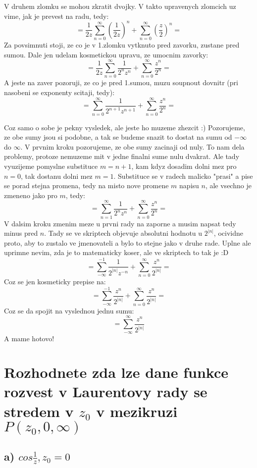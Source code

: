 V druhem zlomku se mohou zkratit dvojky. V takto upravenych zlomcich uz vime, jak je prevest na radu, tedy:
$$ = \frac{1}{2z} \sum_{n=0}^\infty \left( \frac{1}{2z}\right)^n + \sum_{n=0}^\infty \left(\frac{z}{2}\right) ^n = $$
Za povsimnuti stoji, ze co je v 1.zlomku vytknuto pred zavorku, zustane pred sumou. Dale jen udelam kosmetickou upravu, ze umocnim zavorky:
$$=\frac{1}{2z} \sum_{n=0}^\infty \frac{1}{2^n z^n} + \sum_{n=0}^\infty \frac{z^n}{2^n} =$$
A jeste na zaver pozoruji, ze co je pred 1.sumou, muzu soupnout dovnitr (pri nasobeni se exponenty scitaji, tedy):
$$ = \sum_{n=0}^\infty \frac{1}{2^{n+1} z^{n+1}} + \sum_{n=0}^\infty \frac{z^n}{2^n} = $$

Coz samo o sobe je pekny vysledek, ale jeste ho muzeme zhezcit :) Pozorujeme, ze obe sumy jsou si podobne, a tak se budeme snazit to dostat na sumu od $-\infty$ do $\infty$. V prvnim kroku pozorujeme, ze obe sumy zacinaji od nuly. To nam dela problemy, protoze nemuzeme mit v jedne finalni sume nulu dvakrat. Ale tady vyuzijeme pomyslne substituce $m=n+1$, kam kdyz dosadim dolni mez pro $n=0$, tak dostanu dolni mez $m=1$. Substituce se v radech malicko "prasi" a pise se porad stejna promena, tedy na misto nove promene $m$ napisu $n$, ale vsechno je zmeneno jako pro $m$, tedy:
$$ = \sum_{n=1}^\infty \frac{1}{2^{n} z^{n}} + \sum_{n=0}^\infty \frac{z^n}{2^n} = $$
V dalsim kroku zmenim meze u prvni rady na zaporne a musim napsat tedy minus pred $n$. Tady se ve skriptech objevuje absolutni hodnotu u $2^{|n|}$, ocividne proto, aby to zustalo ve jmenovateli a bylo to stejne jako v druhe rade. Uplne ale uprimne nevim, zda je to matematicky koser, ale ve skriptech to tak je :D
$$ = \sum_{-\infty}^{-1} \frac{1}{2^{|n|} z^{-n}} + \sum_{n=0}^\infty \frac{z^n}{2^{|n|}} = $$
Coz se jen kosmeticky prepise na:
$$ = \sum_{-\infty}^{-1} \frac{z^n}{2^{|n|}} + \sum_{n=0}^\infty \frac{z^n}{2^{|n|}} = $$
Coz se da spojit na vyslednou jednu sumu:
$$ = \sum_{-\infty}^\infty \frac{z^n}{2^{|n|}}$$
A mame hotovo!

\newpage
\section{Rozhodnete zda lze dane funkce rozvest v Laurentovy rady se stredem v $z_0$ v mezikruzi $P(z_0,0,\infty)$}

\subsection{a) $cos \frac{1}{z}, z_0 = 0$}